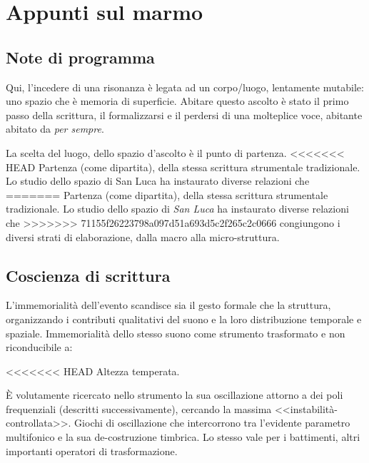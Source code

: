 
\chapter{Appunti sul marmo}
\label{cap:appunti}

\section{Note di programma}

Qui, l’incedere di una risonanza è legata ad un corpo/luogo, lentamente mutabile:
uno spazio che è memoria di superficie. Abitare questo ascolto è stato il primo
passo della scrittura, il formalizzarsi e il perdersi di una molteplice voce,
abitante abitato da \emph{per sempre}.

La scelta del luogo, dello spazio d'ascolto è il punto di partenza.
<<<<<<< HEAD
Partenza (come dipartita), della stessa scrittura strumentale tradizionale.
Lo studio dello spazio di San Luca ha instaurato diverse relazioni che
=======
Partenza (come dipartita), della stessa scrittura strumentale tradizionale. 
Lo studio dello spazio di \emph{San Luca} ha instaurato diverse relazioni che
>>>>>>> 71155f26223798a097d51a693d5c2f265c2c0666
congiungono i diversi strati di elaborazione, dalla macro alla micro-struttura.

\section{Coscienza di scrittura}

L'immemorialità dell'evento scandisce sia il gesto formale che la struttura,
organizzando i contributi qualitativi del suono e la loro distribuzione
temporale e spaziale. Immemorialità dello stesso suono come strumento trasformato
e non riconducibile a:

<<<<<<< HEAD
Altezza temperata.

È volutamente ricercato nello strumento la sua oscillazione  attorno a dei
poli frequenziali (descritti successivamente), cercando la massima <<instabilità-controllata>>.
Giochi di oscillazione che intercorrono tra l’evidente parametro multifonico e la sua de-costruzione timbrica.
Lo stesso vale per i battimenti, altri importanti operatori di trasformazione.


